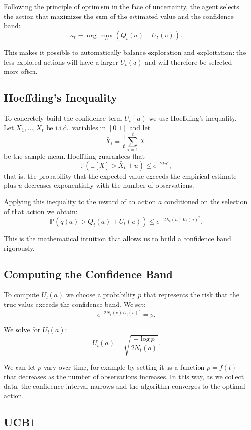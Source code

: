 Following the principle of optimism in the face of uncertainty, the agent selects the action that maximizes the sum of the estimated value and the confidence band:
\[
a_t = \arg\max_a \left( Q_t(a) + U_t(a) \right).
\]

This makes it possible to automatically balance exploration and exploitation: the less explored actions will have a larger $U_t(a)$ and will therefore be selected more often.

\subsection{Hoeffding's Inequality}

To concretely build the confidence term $U_t(a)$ we use Hoeffding's inequality. Let $X_1, \dots, X_t$ be i.i.d.\ variables in $[0,1]$ and let
\[
\bar{X}_t = \frac{1}{t} \sum_{\tau=1}^t X_\tau
\]
be the sample mean. Hoeffding guarantees that
\[
\mathbb{P}\!\left( \mathbb{E}[X] > \bar{X}_t + u \right) \le e^{-2tu^2},
\]
that is, the probability that the expected value exceeds the empirical estimate plus $u$ decreases exponentially with the number of observations.

Applying this inequality to the reward of an action $a$ conditioned on the selection of that action we obtain:
\[
\mathbb{P}\!\left( q(a) > Q_t(a) + U_t(a) \right)
\le e^{-2 N_t(a)\, U_t(a)^2}.
\]

This is the mathematical intuition that allows us to build a confidence band rigorously.

\subsection{Computing the Confidence Band}

To compute $U_t(a)$ we choose a probability $p$ that represents the risk that the true value exceeds the confidence band. We set:
\[
e^{-2 N_t(a)\, U_t(a)^2} = p.
\]

We solve for $U_t(a)$:
\[
U_t(a) = \sqrt{\frac{-\log p}{2N_t(a)}}.
\]

We can let $p$ vary over time, for example by setting it as a function $p=f(t)$ that decreases as the number of observations increases. In this way, as we collect data, the confidence interval narrows and the algorithm converges to the optimal action.

\subsection{UCB1}

